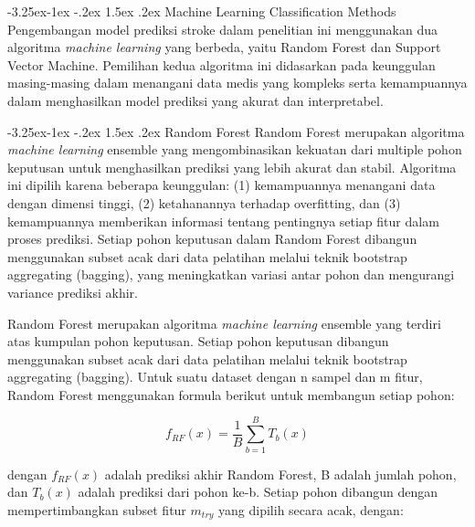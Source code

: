 \documentclass[10pt]{article}
\makeatletter
\renewcommand\subsection{\@startsection{subsection}{2}{\z@}%
  {-3.25ex\@plus -1ex \@minus -.2ex}%
  {1.5ex \@plus .2ex}%
  {\normalfont\itshape\normalsize}}
\renewcommand\subsubsection{\@startsection{subsubsection}{3}{\z@}%
  {-3.25ex\@plus -1ex \@minus -.2ex}%
  {1.5ex \@plus .2ex}%
  {\normalfont\itshape\normalsize}}
\makeatother
\begin{document}
\begin{multicols}{2}
    \setlength{\columnsep}{0.4pt} %
    \raggedcolumns%
    \sloppy

    \subsection{Machine Learning Classification Methods}
    Pengembangan model prediksi stroke dalam penelitian ini menggunakan dua
    algoritma \textit{machine learning} yang berbeda, yaitu Random Forest dan
    Support Vector Machine. Pemilihan kedua algoritma ini didasarkan pada
    keunggulan masing-masing dalam menangani data medis yang kompleks serta
    kemampuannya dalam menghasilkan model prediksi yang akurat dan
    interpretabel\cite{zhang2023random}.

    \subsubsection{Random Forest}
    Random Forest merupakan algoritma \textit{machine learning} ensemble yang
    mengombinasikan kekuatan dari multiple pohon keputusan untuk menghasilkan
    prediksi yang lebih akurat dan stabil\cite{zhang2023random}. Algoritma ini
    dipilih karena beberapa keunggulan: (1) kemampuannya menangani data dengan
    dimensi tinggi, (2) ketahanannya terhadap overfitting, dan (3) kemampuannya
    memberikan informasi tentang pentingnya setiap fitur dalam proses prediksi.
    Setiap pohon keputusan dalam Random Forest dibangun menggunakan subset acak
    dari data pelatihan melalui teknik bootstrap aggregating (bagging), yang
    meningkatkan variasi antar pohon dan mengurangi variance prediksi akhir.

    Random Forest merupakan algoritma \textit{machine learning} ensemble yang
    terdiri atas kumpulan pohon keputusan. Setiap pohon keputusan dibangun
    menggunakan subset acak dari data pelatihan melalui teknik bootstrap
    aggregating (bagging). Untuk suatu dataset dengan n sampel dan m fitur, Random
    Forest menggunakan formula berikut untuk membangun setiap pohon:

    \begin{equation}
        f_{RF}(x) = \frac{1}{B}\sum_{b=1}^{B}T_b(x)
    \end{equation}

    dengan $f_{RF}(x)$ adalah prediksi akhir Random Forest, B adalah jumlah pohon,
    dan $T_b(x)$ adalah prediksi dari pohon ke-b. Setiap pohon dibangun dengan
    mempertimbangkan subset fitur $m_{try}$ yang dipilih secara acak, dengan:


\end{multicols}
\end{document}
